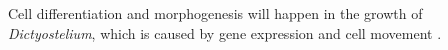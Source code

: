 Cell differentiation and morphogenesis will happen in the growth of \textsl{Dictyostelium}, which is caused by gene expression and cell movement \cite{gross_developmental_1994}.